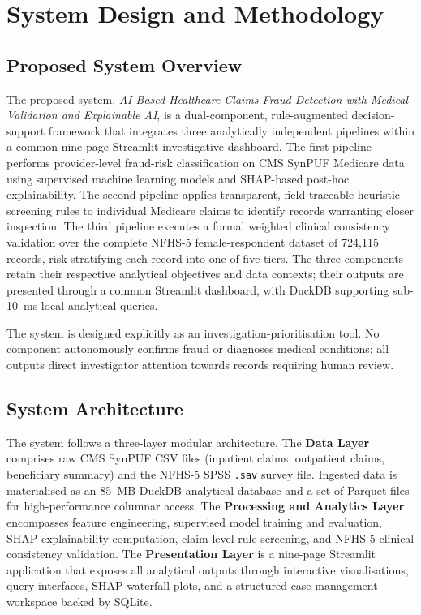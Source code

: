 \chapter{System Design and Methodology}
\label{ch:design}

\section{Proposed System Overview}

The proposed system, \textit{AI-Based Healthcare Claims Fraud Detection with Medical Validation and Explainable AI}, is a dual-component, rule-augmented decision-support framework that integrates three analytically independent pipelines within a common nine-page Streamlit investigative dashboard. The first pipeline performs provider-level fraud-risk classification on CMS SynPUF Medicare data using supervised machine learning models and SHAP-based post-hoc explainability. The second pipeline applies transparent, field-traceable heuristic screening rules to individual Medicare claims to identify records warranting closer inspection. The third pipeline executes a formal weighted clinical consistency validation over the complete NFHS-5 female-respondent dataset of 724,115 records, risk-stratifying each record into one of five tiers. The three components retain their respective analytical objectives and data contexts; their outputs are presented through a common Streamlit dashboard, with DuckDB supporting sub-10~ms local analytical queries.

The system is designed explicitly as an investigation-prioritisation tool. No component autonomously confirms fraud or diagnoses medical conditions; all outputs direct investigator attention towards records requiring human review.

\section{System Architecture}
\label{sec:architecture}

The system follows a three-layer modular architecture. The \textbf{Data Layer} comprises raw CMS SynPUF CSV files (inpatient claims, outpatient claims, beneficiary summary) and the NFHS-5 SPSS \texttt{.sav} survey file. Ingested data is materialised as an 85~MB DuckDB analytical database and a set of Parquet files for high-performance columnar access. The \textbf{Processing and Analytics Layer} encompasses feature engineering, supervised model training and evaluation, SHAP explainability computation, claim-level rule screening, and NFHS-5 clinical consistency validation. The \textbf{Presentation Layer} is a nine-page Streamlit application that exposes all analytical outputs through interactive visualisations, query interfaces, SHAP waterfall plots, and a structured case management workspace backed by SQLite.

